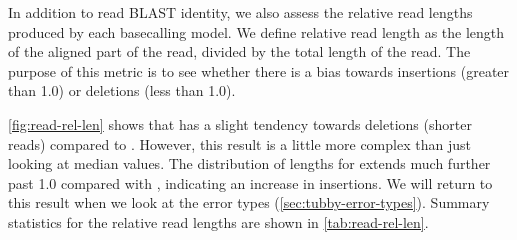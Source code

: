 \begin{table}
\centering
{}
\caption{Read BLAST identity summary statistics for the \mtb{}-specific basecalling model \tubby{} compared with the default \guppy{} model. Version indicates the \guppy{} version used for the basecalling prior to, and after, training. BLAST identity is the number of matching bases (in a read alignment) divided by the length of the alignment. Count refers to the number of reads evaluated. std=standard deviation.}
\label{tab:read-blast}
\end{table}

In addition to read BLAST identity, we also assess the relative read lengths produced by each basecalling model. We define relative read length as the length of the aligned part of the read, divided by the total length of the read. The purpose of this metric is to see whether there is a bias towards insertions (greater than 1.0) or deletions (less than 1.0). 

\autoref{fig:read-rel-len} shows that \tubby{} has a slight tendency towards deletions (shorter reads) compared to \guppy{}. However, this result is a little more complex than just looking at median values. The distribution of lengths for \guppy{} extends much further past 1.0 compared with \tubby{}, indicating an increase in insertions. We will return to this result when we look at the error types (\autoref{sec:tubby-error-types}). Summary statistics for the relative read lengths are shown in \autoref{tab:read-rel-len}.


